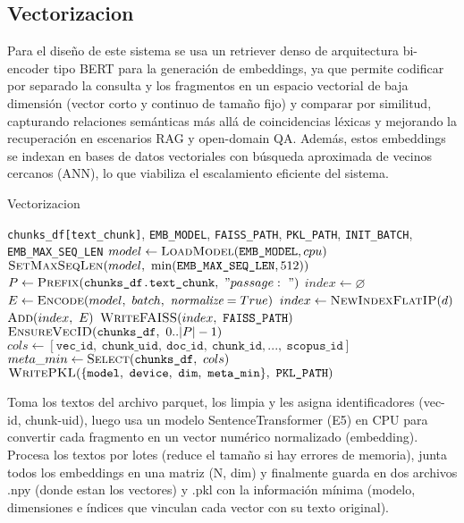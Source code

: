 \subsection{Vectorizacion}
Para el diseño de este sistema se usa un retriever denso de arquitectura bi-encoder tipo BERT para la generación de embeddings, ya que permite codificar por separado la 
consulta y los fragmentos en un espacio vectorial de baja dimensión (vector corto y continuo de tamaño fijo) y comparar por similitud, 
capturando relaciones semánticas más allá de coincidencias léxicas y mejorando la recuperación en escenarios RAG y open-domain QA.
Además, estos embeddings se indexan en bases de datos vectoriales con búsqueda aproximada de vecinos cercanos (ANN), lo que viabiliza el escalamiento eficiente del sistema\parencite{joshi2025vector}.
\begin{algorithmEN}[H]
  \caption{Vectorizacion }
  \begin{algorithmic}[1]
    \Require \texttt{chunks\_df[text\_chunk]}, \texttt{EMB\_MODEL}, \texttt{FAISS\_PATH}, \texttt{PKL\_PATH}, \texttt{INIT\_BATCH}, \texttt{EMB\_MAX\_SEQ\_LEN}
    \State $model \gets \textsc{LoadModel}(\texttt{EMB\_MODEL}, cpu)$ 
    \State $\textsc{SetMaxSeqLen}(model,\ \min(\texttt{EMB\_MAX\_SEQ\_LEN},512))$ 
    \State $P \gets \textsc{Prefix}(\texttt{chunks\_df.text\_chunk},\ "passage:\ ")$ 
    \State $index \gets \varnothing$ 
     
      \State $E \gets \textsc{Encode}(model,\ batch,\ \textit{normalize}=True)$ 
       \State $index \gets \textsc{NewIndexFlatIP}(d)$ \EndIf
      \State $\textsc{Add}(index,\ E)$ 
    \EndFor
    \State $\textsc{WriteFAISS}(index,\ \texttt{FAISS\_PATH})$ 
    \State $\textsc{EnsureVecID}(\texttt{chunks\_df},\ 0..|P|-1)$ 
  \State $cols \gets [\texttt{vec\_id},\ \texttt{chunk\_uid},\ \texttt{doc\_id},\ \texttt{chunk\_id},...,\ \texttt{scopus\_id}]$
  \State $meta\_min \gets \textsc{Select}(\texttt{chunks\_df},\ cols)$
    \State $\textsc{WritePKL}(\{\texttt{model},\ \texttt{device},\ \texttt{dim},\ \texttt{meta\_min}\},\ \texttt{PKL\_PATH})$

  \end{algorithmic}
\end{algorithmEN}


Toma los textos del archivo parquet, los limpia y les asigna identificadores (vec-id, chunk-uid), luego usa un modelo SentenceTransformer (E5) en CPU para convertir cada fragmento en un vector numérico normalizado (embedding).
Procesa los textos por lotes (reduce el tamaño si hay errores de memoria), junta todos los embeddings en una matriz (N, dim) y finalmente guarda en dos archivos .npy (donde estan los vectores) y .pkl con la información mínima (modelo, dimensiones e índices que vinculan cada vector con su texto original).

